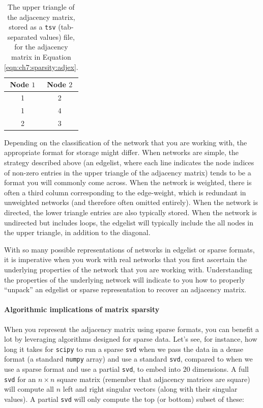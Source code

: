 \begin{table}[h]
    \centering
    \begin{tabular}{c| c}
        Node $1$ & Node $2$  \\
        \hline
         1 & 2\\
         1 & 4 \\
         2 & 3
    \end{tabular}
    \caption[Edgelist network storage format]{The upper triangle of the adjacency matrix, stored as a \texttt{tsv} (tab-separated values) file, for the adjacency matrix in Equation \eqref{eqn:ch7:sparsity:adjex}.}
    \label{tab:adjlist}
\end{table}

Depending on the classification of the network that you are working with, the appropriate format for storage might differ. When networks are simple, the strategy described above (an edgelist, where each line indicates the node indices of non-zero entries in the upper triangle of the adjacency matrix) tends to be a format you will commonly come across. When the network is weighted, there is often a third column corresponding to the edge-weight, which is redundant in unweighted networks (and therefore often omitted entirely). When the network is directed, the lower triangle entries are also typically stored. When the network is undirected but includes loops, the edgelist will typically include the all nodes in the upper triangle, in addition to the diagonal. 

With so many possible representations of networks in edgelist or sparse formats, it is imperative when you work with real networks that you first ascertain the underlying properties of the network that you are working with. Understanding the properties of the underlying network will indicate to you how to properly ``unpack'' an edgelist or sparse representation to recover an adjacency matrix.

\paragraph*{Algorithmic implications of matrix sparsity}

When you represent the adjacency matrix using sparse formats, you can benefit a lot by leveraging algorithms designed for sparse data. Let's see, for instance, how long it takes for \texttt{scipy} to run a sparse \texttt{svd} when we pass the data in a dense format (a standard \texttt{numpy} array) and use a standard \texttt{svd}, compared to when we use a sparse format and use a partial \texttt{svd}, to embed into $20$ dimensions. A full \texttt{svd} for an $n \times n$ square matrix (remember that adjacency matrices are square) will compute all $n$ left and right singular vectors (along with their singular values). A partial \texttt{svd} will only compute the top (or bottom) subset of these:

